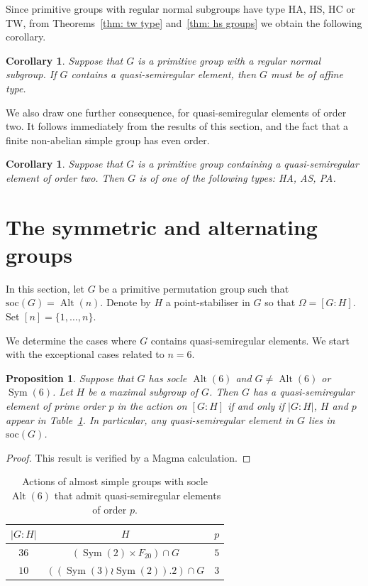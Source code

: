 \documentclass{article}
\newtheorem{cor}[thm]{Corollary}
\newtheorem{prop}[thm]{Proposition}
\theoremstyle{remark}
\theoremstyle{definition}
\DeclareMathOperator{\Alt}{Alt}
\DeclareMathOperator{\Sym}{Sym}
\newcommand{\soc}{\mathrm{soc}}
\newcommand{\qsre}{quasi-semiregular element}
\newcommand{\qsres}{quasi-semiregular elements}
\begin{document}
Since primitive groups with regular normal subgroups have type HA, HS, HC or TW, 
from Theorems~\ref{thm: tw type} and~\ref{thm: hs groups} we obtain the following corollary.

\begin{cor}
    \label{cor:affine}
    Suppose that $G$ is a primitive group with a regular normal subgroup. If $G$ contains a {\qsre}, then $G$ must be of affine type.
\end{cor}



We also draw one further consequence, for {\qsres} of order two. It follows immediately from the results of this section, and the fact that a finite non-abelian simple group has even order.

\begin{cor}\label{cor:qsr invols}
    Suppose that $G$ is a primitive group containing a {\qsre} of order two. Then $G$ is of one of the  following types: HA, AS, PA.
\end{cor}

\section{The symmetric and alternating groups}

In this section, let $G$ be a primitive permutation group such that $\soc(G)=\Alt(n)$. Denote by $H$ a point-stabiliser in $G$ so that $\Omega = [G:H]$.  Set $[n]=\{1,\ldots,n\}$. 

We determine the cases where $G$ contains {\qsres}. We start with the exceptional cases related to $n=6$.

\begin{prop}
Suppose that $G$ has socle $\Alt(6)$ and $G\neq \Alt(6)$ or $\Sym(6)$. Let $H$ be a maximal subgroup of $G$. Then $G$ has a {\qsre} of prime order $p$ in the action on $[G:H]$ if and only if $|G:H|$, $H$ and $p$ appear in Table~\ref{tab:auta6}. In particular, any {\qsre} in $G$ lies in $\soc(G)$.
\end{prop}
\begin{proof}
This result is verified by a {\sc Magma} calculation.
\end{proof}


\begin{table}
    \centering
    \begin{tabular}{c|c|c}
         $|G:H|$ & $H$  & $p$   \\ \hline
          $36$ & $(\Sym(2)\times F_{20})\cap G$ & $5$ \\
          $10$ & $((\Sym(3)\wr\Sym(2)).2) \cap G$ & $3$ 
    \end{tabular}
    \caption{Actions of almost simple groups with socle $\Alt(6)$ that admit {\qsres} of order $p$.}
    \label{tab:auta6}
\end{table}
\end{document}
